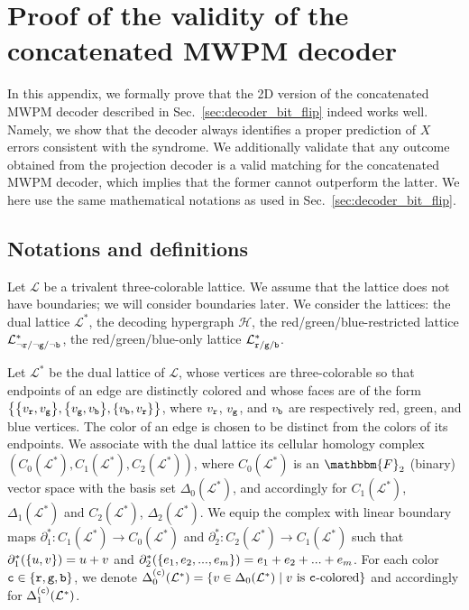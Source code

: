 \documentclass[a4paper,twocolumn,11pt,accepted=2025-01-21]{quantumarticle}
\theoremstyle{definition}
\theoremstyle{definition}
\theoremstyle{definition}
\begin{document}


\section{Proof of the validity of the concatenated MWPM decoder \label{app:validity_proof}}

In this appendix, we formally prove that the 2D version of the concatenated MWPM decoder described in Sec.~\ref{sec:decoder_bit_flip} indeed works well.
Namely, we show that the decoder always identifies a proper prediction of $X$ errors consistent with the syndrome.
We additionally validate that any outcome obtained from the projection decoder is a valid matching for the concatenated MWPM decoder, which implies that the former cannot outperform the latter.
We here use the same mathematical notations as used in Sec.~\ref{sec:decoder_bit_flip}.

\subsection{Notations and definitions \label{subsec:validity_proof_notations}}

Let $\mathcal{L}$ be a trivalent three-colorable lattice. 
We assume that the lattice does not have boundaries; we will consider boundaries later.
We consider the lattices: the dual lattice $\mathcal{L}^*$, the decoding hypergraph $\mathcal{H}$, the red/green/blue-restricted lattice $\LatticeRest{\rbs/\neg \gbs/\neg \bbs}$, the red/green/blue-only lattice $\LatticeMono{\rbs/\gbs/\bbs}$.

Let $\mathcal{L}^*$ be the dual lattice of $\mathcal{L}$, whose vertices are three-colorable so that endpoints of an edge are distinctly colored and whose faces are of the form $\qty{\qty{v_\rbs,v_\gbs},\qty{v_\gbs,v_\bbs},\qty{v_\bbs,v_\rbs}}$, where $v_\rbs$, $v_\gbs$, and $v_\bbs$ are respectively red, green, and blue vertices. 
The color of an edge is chosen to be distinct from the colors of its endpoints. 
We associate with the dual lattice its cellular homology complex $(C_0(\mathcal{L}^*),C_1(\mathcal{L}^*),C_2(\mathcal{L}^*))$, where $C_0(\mathcal{L}^*)$ is an $\mathbbm{F}_2$ (binary) vector space with the basis set $\Delta_0(\mathcal{L}^*)$, and accordingly for $C_1(\mathcal{L}^*)$, $\Delta_1(\mathcal{L}^*)$ and $C_2(\mathcal{L}^*)$, $\Delta_2(\mathcal{L}^*)$.
We equip the complex with linear boundary maps $\partial_1^*: C_1(\mathcal{L}^*) \rightarrow C_0(\mathcal{L}^*)$ and $\partial_2^*: C_2(\mathcal{L}^*) \rightarrow C_1(\mathcal{L}^*)$ such that $\partial_1^*(\qty{u,v}) = u+v$ and $\partial_2^*(\qty{e_1,e_2,...,e_m}) = e_1+e_2+...+e_m$.
For each color $\cbs \in \qty{\rbs, \gbs, \bbs}$, we denote $\latelmcolor{\mathcal{L}^*}{0}{\cbs} = \qty{v \in \latelm{\mathcal{L}^*}{0} \;\vert\; \text{$v$ is \cbs-colored}}$ and accordingly for $\latelmcolor{\mathcal{L}^*}{1}{\cbs}$.
\end{document}
